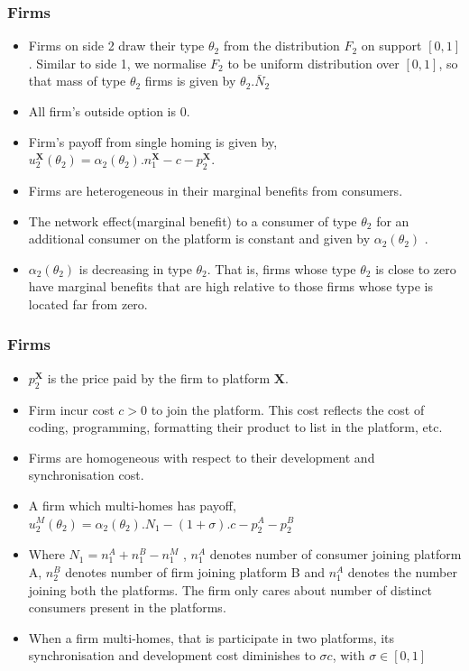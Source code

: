 \documentclass[11pt]{beamer}
\theoremstyle{boldstyle}
\begin{document}
		\begin{frame}
			\frametitle{Firms }
			\begin{small}
				\begin{itemize}
					\item Firms on side 2 draw their type $\theta_2$ from the distribution $F_2$ on support $[0,1]$. Similar to side 1, we normalise $F_2$ to be uniform distribution over $[0,1]$, so that mass of type $\theta_2$ firms is given by $\theta_2.\bar{N}_2$  
					\item  All firm's outside option is 0. 
					\item Firm's payoff from single homing is given by, $u_2^{\mathbf{X}}(\theta_2)=\alpha_2(\theta_2).n_1^\mathbf{X} - c - p_2^\mathbf{X}$.
					\item Firms are heterogeneous in their marginal benefits from consumers. 
					\item The network effect(marginal benefit) to a consumer of type $\theta_2$ for an additional consumer on the platform is constant and given by $\alpha_2(\theta_2)$ .
					\item $\alpha_2(\theta_2)$ is decreasing in type $\theta_2$. That is, firms whose type $\theta_2$ is close to zero have marginal benefits that are high relative to those firms whose type is located far from zero. 
					
				\end{itemize}
			\end{small}
		\end{frame}
		
		\begin{frame}
	\frametitle{Firms }
	\begin{small}
		\begin{itemize}
			\item $p_2^\mathbf{X}$ is the price paid by the firm to platform $\mathbf{X}$.
			\item  Firm incur cost $c>0$ to join the platform. This cost reflects the cost of coding, programming, formatting their product to list in the platform, etc. 
			\item Firms are homogeneous with respect to their development and synchronisation cost.
			\item A firm which multi-homes has payoff, $u_2^M(\theta_2)=\alpha_2(\theta_2).N_1-(1+\sigma).c -p_2^A - p_2^B$ 
			\item Where $N_1= n_1^A+n_1^B-n_1^M$ , $n_1^A$ denotes number of consumer joining platform A, $n_2^B$ denotes number of firm joining platform B and $n_1^A$ denotes the number joining both the platforms. The firm only cares about number of distinct consumers present in the platforms. 
			\item  When a firm multi-homes, that is participate in two platforms, its synchronisation and development cost diminishes to $\sigma c$, with $\sigma \in [0,1]$ 
			
		\end{itemize}
	\end{small}
\end{frame}
	
\end{document}

